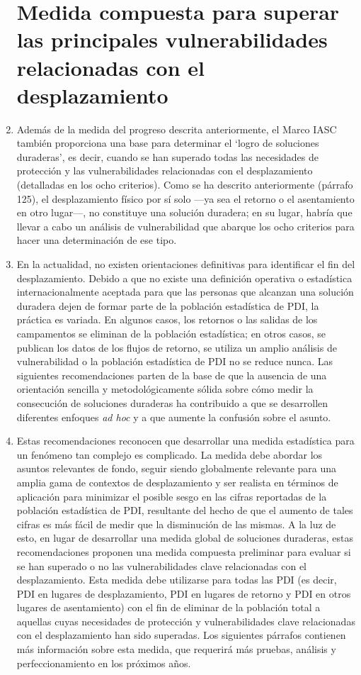 \documentclass[
]{book}
\begin{document}
\begin{enumerate}
{  \section{Medida compuesta para superar las principales vulnerabilidades relacionadas con el desplazamiento}\label{medida-compuesta-para-superar-las-principales-vulnerabilidades-relacionadas-con-el-desplazamiento}}
\item
  Además de la medida del progreso descrita anteriormente, el Marco IASC también proporciona una base para determinar el `logro de soluciones duraderas', es decir, cuando se han superado todas las necesidades de protección y las vulnerabilidades relacionadas con el desplazamiento (detalladas en los ocho criterios). Como se ha descrito anteriormente (párrafo 125), el desplazamiento físico por sí solo ---ya sea el retorno o el asentamiento en otro lugar---, no constituye una solución duradera; en su lugar, habría que llevar a cabo un análisis de vulnerabilidad que abarque los ocho criterios para hacer una determinación de ese tipo.
\item
  En la actualidad, no existen orientaciones definitivas para identificar el fin del desplazamiento. Debido a que no existe una definición operativa o estadística internacionalmente aceptada para que las personas que alcanzan una solución duradera dejen de formar parte de la población estadística de PDI, la práctica es variada. En algunos casos, los retornos o las salidas de los campamentos se eliminan de la población estadística; en otros casos, se publican los datos de los flujos de retorno, se utiliza un amplio análisis de vulnerabilidad o la población estadística de PDI no se reduce nunca. Las siguientes recomendaciones parten de la base de que la ausencia de una orientación sencilla y metodológicamente sólida sobre cómo medir la consecución de soluciones duraderas ha contribuido a que se desarrollen diferentes enfoques \emph{ad hoc} y a que aumente la confusión sobre el asunto.
\item
  Estas recomendaciones reconocen que desarrollar una medida estadística para un fenómeno tan complejo es complicado. La medida debe abordar los asuntos relevantes de fondo, seguir siendo globalmente relevante para una amplia gama de contextos de desplazamiento y ser realista en términos de aplicación para minimizar el posible sesgo en las cifras reportadas de la población estadística de PDI, resultante del hecho de que el aumento de tales cifras es más fácil de medir que la disminución de las mismas. A la luz de esto, en lugar de desarrollar una medida global de soluciones duraderas, estas recomendaciones proponen una medida compuesta preliminar para evaluar si se han superado o no las vulnerabilidades clave relacionadas con el desplazamiento. Esta medida debe utilizarse para todas las PDI (es decir, PDI en lugares de desplazamiento, PDI en lugares de retorno y PDI en otros lugares de asentamiento) con el fin de eliminar de la población total a aquellas cuyas necesidades de protección y vulnerabilidades clave relacionadas con el desplazamiento han sido superadas. Los siguientes párrafos contienen más información sobre esta medida, que requerirá más pruebas, análisis y perfeccionamiento en los próximos años.

\end{enumerate}
\end{document}

